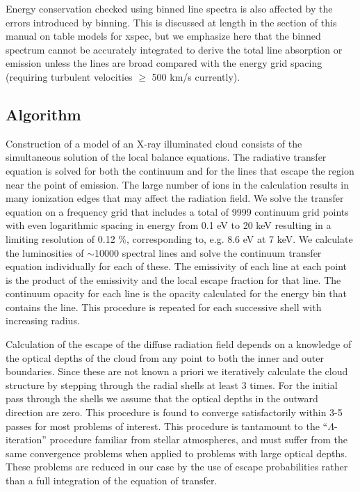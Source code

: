 Energy conservation checked using binned line spectra is also affected by the 
errors introduced by binning.  This is discussed at length in the section of this 
manual on table models for xspec, but we emphasize here that the binned 
spectrum cannot be accurately integrated to derive the total 
line absorption or emission unless the lines are broad compared 
with the energy grid spacing (requiring turbulent velocities $\geq$ 500 km/s currently).


\subsection{Algorithm}

Construction of a model of an X-ray
illuminated cloud consists of the simultaneous  solution of the local
balance equations.  The radiative transfer equation is
solved for both  the continuum and for the lines that escape the
region near the point of emission.  The large number  of ions in the
calculation results in many ionization edges that may affect the
radiation field.  We  solve the transfer equation on a frequency grid
that includes a total of 9999 continuum  grid points with even 
logarithmic spacing in energy from 0.1 eV to 20 keV resulting 
in a limiting resolution of  0.12 $\%$, corresponding to, e.g. 8.6 eV at 7 keV.
We calculate the luminosities of $\sim$10000 spectral lines and
solve the continuum transfer equation  individually for each of these.
The emissivity of each line at each point is the product of the 
emissivity  and the local escape fraction for
that line. The continuum opacity for each
line is the opacity calculated for the energy bin that contains the 
line. This procedure  is repeated for each successive shell with
increasing radius.

Calculation of the escape of the diffuse radiation 
field depends on a knowledge of the 
optical depths of the cloud from any point to both the inner and outer
boundaries.  Since these are not known a priori we iteratively 
calculate the cloud structure by stepping through the radial shells
at least 3 times.  For the initial pass through the shells we assume 
that the optical depths in the outward direction are zero.  This 
procedure is found to converge satisfactorily within 3-5 passes 
for most problems of interest.  This procedure is tantamount to the 
``$\Lambda$-iteration'' procedure familiar from stellar atmospheres, and
must suffer from the same convergence problems when applied to problems
with large optical depths.  These problems are reduced in our case 
by the use of escape probabilities rather than a full integration 
of the equation of transfer.

